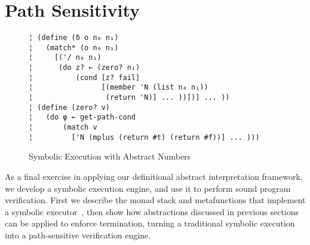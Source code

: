 \section{Path Sensitivity}\label{s:symbolic}

\begin{figure} %
\begin{lstlisting}
¦ (define (δ o n₀ n₁)
¦   (match* (o n₀ n₁)
¦     [('/ n₀ n₁)
¦      (do z? ← (zero? n₁)
¦          (cond [z? fail]
¦                [(member 'N (list n₀ n₁))
¦                 (return 'N)] ... ))])] ... ))
¦ (define (zero? v)
¦   (do φ ← get-path-cond
¦       (match v 
¦         ['N (mplus (return #t) (return #f))] ... )))
\end{lstlisting}
\vspace{-0.75em}
\caption{Symbolic Execution with Abstract Numbers}
\label{f:symbolic-widen}
\vspace{-1em}
\end{figure} %

As a final exercise in applying our definitional abstract interpretation
framework, we develop a symbolic execution engine, and use it to perform sound
program verification. First we describe the monad stack and metafunctions that
implement a symbolic executor~\cite{dvanhorn:King1976Symbolic}, then show how
abstractions discussed in previous sections can be applied to enforce
termination, turning a traditional symbolic execution into a path-sensitive
verification engine.

